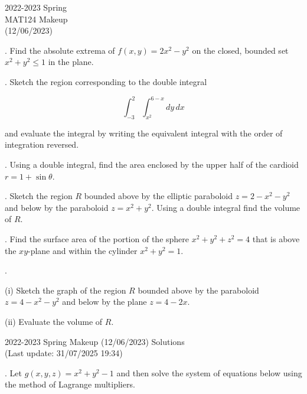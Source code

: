 \documentclass{article}
\begin{document}
\pagestyle{empty}
\large

\begin{center}
2022-2023 Spring \\MAT124 Makeup\\(12/06/2023)
\end{center}

. Find the absolute extrema of $f(x,y) = 2x^2-y^2$ on the closed, bounded set $x^2+y^2\leq1$ in the plane.

\hfill

. Sketch the region corresponding to the double integral

\begin{equation*}\int_{-3}^2\int_{x^2}^{6-x}dy\,dx\end{equation*}

\hfill

\noindent and evaluate the integral by writing the equivalent integral with the order of integration reversed.

\hfill

. Using a double integral, find the area enclosed by the upper half of the cardioid $r=1+\sin\theta$.

\hfill

. Sketch the region $R$ bounded above by the elliptic paraboloid $z=2-x^2-y^2$ and below by the paraboloid $z=x^2+y^2$. Using a double integral find the volume of $R$.

\hfill

. Find the surface area of the portion of the sphere $x^2+y^2+z^2=4$ that is above the $xy$-plane and within the cylinder $x^2+y^2=1$.

\hfill

.

\hfill

\noindent (i) Sketch the graph of the region $R$ bounded above by the paraboloid $z=4-x^2-y^2$ and below by the plane $z=4-2x$.

\hfill

\noindent (ii) Evaluate the volume of $R$.

\newpage

\begin{center}
2022-2023 Spring Makeup (12/06/2023) Solutions\\
(Last update: 31/07/2025 19:34)
\end{center}

. Let $g(x,y,z)=x^2+y^2-1$ and then solve the system of equations below using the method of Lagrange multipliers.
\end{document}
